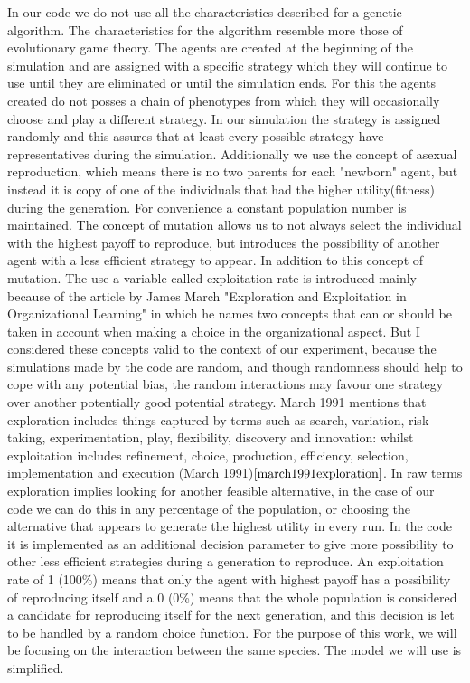 \documentclass{article}
\begin{document}
In our code we do not use all the characteristics described for a genetic algorithm. The characteristics for the algorithm resemble more those of evolutionary game theory. The agents are created at the beginning of the simulation and are assigned with a specific strategy which they will continue to use until they are eliminated or until the simulation ends. For this the agents created do not posses a chain of phenotypes from which they will occasionally choose and play a different strategy. In our simulation the strategy is assigned randomly and this assures that at least every possible strategy have representatives during the simulation. Additionally we use the concept of asexual reproduction, which means there is no two parents for each "newborn" agent, but instead it is copy of one of the individuals that had the higher utility(fitness) during the generation. For convenience a constant population number is maintained. The concept of mutation allows us to not always select the individual with the highest payoff to reproduce, but introduces the possibility of another agent with a less efficient strategy to appear. In addition to this concept of mutation. The use a variable called exploitation rate is introduced mainly because of the article by James March "Exploration and Exploitation in Organizational Learning" in which he names two concepts that can or should be taken in account when making a choice in the organizational aspect. But I considered these concepts valid to the context of our experiment, because the simulations made by the code are random, and though randomness should help to cope with any potential bias, the random interactions may favour one strategy over another potentially good potential strategy. March 1991 mentions that exploration includes things captured by terms such as search, variation, risk taking, experimentation, play, flexibility, discovery and innovation: whilst exploitation includes refinement, choice, production, efficiency, selection, implementation and execution (March 1991)$\cite{march1991exploration}$. In raw terms exploration implies looking for another feasible alternative, in the case of our code we can do this in any percentage of the population, or choosing the alternative that appears to generate the highest utility in every run. In the code it is implemented as  an additional decision parameter to give more possibility to other less efficient strategies during a generation to reproduce. An exploitation rate of 1 (100\%) means that only the agent with highest payoff has a possibility of reproducing itself and a 0 (0\%) means that the whole population is considered a candidate for reproducing itself for the next generation, and this decision is let to be handled by a random choice function. For the purpose of this work, we will be focusing on the interaction between the same species. The model we will use is simplified.
\end{document}
